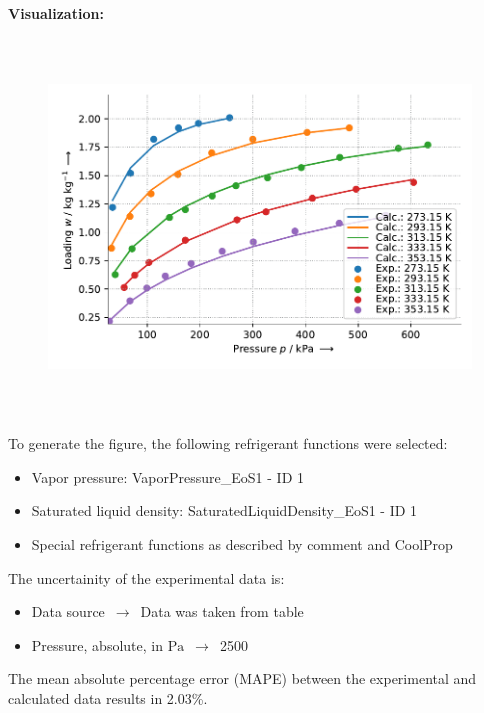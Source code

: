 \textbf{Visualization:}
%
\begin{figure}[!htp]
{\noindent\includegraphics[height=10cm, keepaspectratio]{figs/ads/ads_R-134a_activated_charcoal_powder_Maxsorb_DubininAstakhov_1.pdf}}
\end{figure}
%

To generate the figure, the following refrigerant functions were selected:
\begin{itemize}
\item Vapor pressure: VaporPressure\_EoS1 - ID 1
\item Saturated liquid density: SaturatedLiquidDensity\_EoS1 - ID 1
\item Special refrigerant functions as described by comment and CoolProp
\end{itemize}

The uncertainity of the experimental data is:
\begin{itemize}
\item Data source $\,\to\,$ Data was taken from table
\item Pressure, absolute, in $\si{\pascal}$ $\,\to\,$ 2500
\end{itemize}

The mean absolute percentage error (MAPE) between the experimental and calculated data results in 2.03\%.
\FloatBarrier
\newpage
